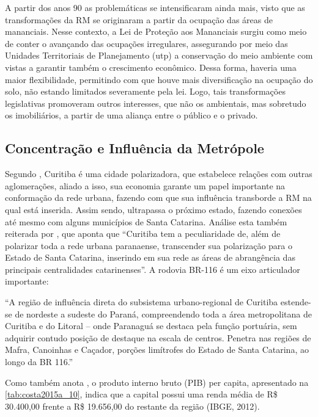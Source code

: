 	A partir dos anos 90 as problemáticas se intensificaram ainda mais, visto que as transformações da RM se originaram a partir da ocupação das áreas de mananciais. Nesse contexto, a Lei de Proteção aos Mananciais surgiu como meio de conter o avançando das ocupações irregulares, assegurando por meio das Unidades Territoriais de Planejamento (\gls{utp}) a conservação do meio ambiente com vistas a garantir também o crescimento econômico. Dessa forma, haveria uma maior flexibilidade, permitindo com que houve mais diversificação na ocupação do solo, não estando limitados severamente pela lei. Logo, tais transformações legislativas promoveram outros interesses, que não os ambientais, mas sobretudo os imobiliários, a partir de uma aliança entre o público e o privado.
	
	\subsection{Concentração e Influência da Metrópole}
		
	Segundo , Curitiba é uma cidade polarizadora, que estabelece relações com outras aglomerações, aliado a isso, sua economia garante um papel importante na conformação da rede urbana, fazendo com que sua influência transborde a RM na qual está inserida. Assim sendo, ultrapassa o próximo estado, fazendo conexões até mesmo com alguns municípios de Santa Catarina. Análise esta também reiterada por , que aponta que ``Curitiba tem a peculiaridade de, além de polarizar toda a rede urbana paranaense, transcender sua polarização para o Estado de Santa Catarina, inserindo em sua rede as áreas de abrangência das principais centralidades catarinenses''. A rodovia BR-116 é um eixo articulador importante:
	
	\begin{citacao}
		``A região de influência direta do subsistema urbano-regional de Curitiba estende-se de nordeste a sudeste do Paraná, compreendendo toda a área metropolitana de Curitiba e do Litoral – onde Paranaguá se destaca pela função portuária, sem adquirir contudo posição de destaque na escala de centros. Penetra nas regiões de Mafra, Canoinhas e Caçador, porções limítrofes do Estado de Santa Catarina, ao longo da BR 116.'' \cite[p. 43]{moura2001a}
	\end{citacao}
	
	Como também anota , o produto interno bruto (PIB) per capita, apresentado na \autoref{tab:costa2015a_10}, indica que a capital possui uma renda média de R\$ 30.400,00 frente a R\$ 19.656,00 do restante da região (IBGE, 2012).
	
